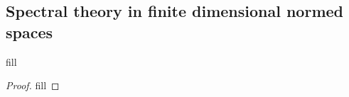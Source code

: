 \subsection{Spectral theory in finite dimensional normed spaces}

\begin{exercise}{1}
fill
\end{exercise}
\begin{proof}
fill
\end{proof}